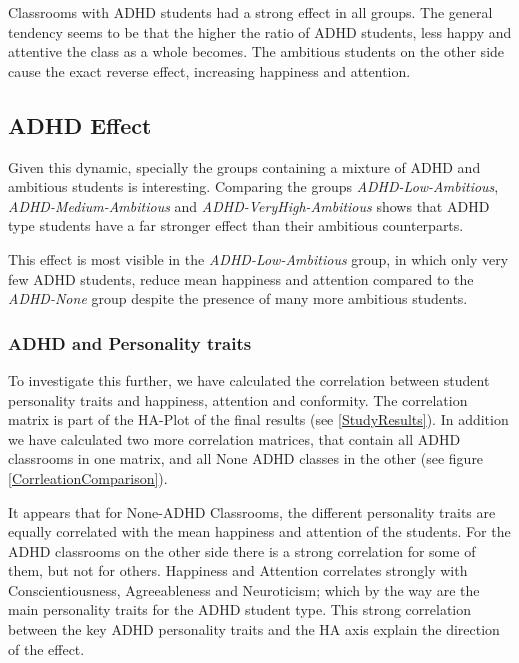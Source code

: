 Classrooms with ADHD students had a strong effect in all groups. The general
tendency seems to be that the higher the ratio of ADHD students, less happy and
attentive the class as a whole becomes. The ambitious students on the other
side cause the exact reverse effect, increasing happiness and attention.

\subsection{ADHD Effect}
Given this dynamic, specially the groups containing a mixture of ADHD and
ambitious students is interesting. Comparing the groups \textit{ADHD-Low-Ambitious},
\textit{ADHD-Medium-Ambitious} and \textit{ADHD-VeryHigh-Ambitious} shows that ADHD
type students have a far stronger effect than their ambitious counterparts.

\bb

This effect is most visible in the \textit{ADHD-Low-Ambitious} group, in which only
very few ADHD students, reduce mean happiness and attention compared to the \textit{ADHD-None}
group despite the presence of many more ambitious students.

\bb

\subsubsection{ADHD and Personality traits}
To investigate this further, we have calculated the correlation between student personality
traits and happiness, attention and conformity. The correlation matrix is part
of the HA-Plot of the final results (see \ref{StudyResults}). In addition we have calculated
two more correlation matrices, that contain all ADHD classrooms in one matrix, and
all None ADHD classes in the other (see figure \ref{CorrleationComparison}).

\bb

It appears that for None-ADHD Classrooms, the different personality traits are equally
correlated with the mean happiness and attention of the students. For the ADHD
classrooms on the other side there is a strong correlation for some of them, but not
for others. Happiness and Attention correlates strongly with Conscientiousness, Agreeableness
and Neuroticism; which by the way are the main personality traits for the ADHD student
type. This strong correlation between the key ADHD personality traits and the HA
axis explain the direction of the effect.

\bb

